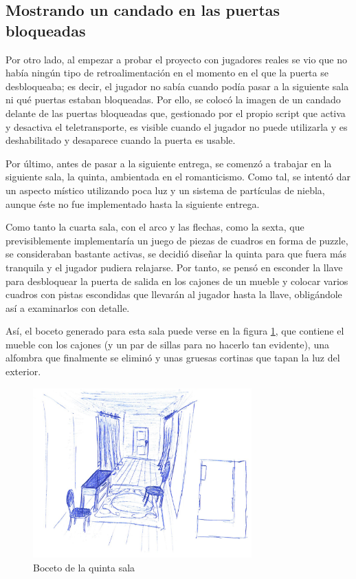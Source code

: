 \subsection{Mostrando un candado en las puertas bloqueadas}

Por otro lado, al empezar a probar el proyecto con jugadores reales se vio que no había ningún tipo de retroalimentación en el momento en el que la puerta se desbloqueaba; es decir, el jugador no sabía cuando podía pasar a la siguiente sala ni qué puertas estaban bloqueadas. Por ello, se colocó la imagen de un candado delante de las puertas bloqueadas que, gestionado por el propio script que activa y desactiva el teletransporte, es visible cuando el jugador no puede utilizarla y es deshabilitado y desaparece cuando la puerta es usable.

Por último, antes de pasar a la siguiente entrega, se comenzó a trabajar en la siguiente sala, la quinta, ambientada en el romanticismo. Como tal, se intentó dar un aspecto místico utilizando poca luz y un sistema de partículas de niebla, aunque éste no fue implementado hasta la siguiente entrega.

Como tanto la cuarta sala, con el arco y las flechas, como la sexta, que previsiblemente implementaría un juego de piezas de cuadros en forma de puzzle, se consideraban bastante activas, se decidió diseñar la quinta para que fuera más tranquila y el jugador pudiera relajarse. Por tanto, se pensó en esconder la llave para desbloquear la puerta de salida en los cajones de un mueble y colocar varios cuadros con pistas escondidas que llevarán al jugador hasta la llave, obligándole así a examinarlos con detalle.

Así, el boceto generado para esta sala puede verse en la figura \ref{fig:boceto-sala-5}, que contiene el mueble con los cajones (y un par de sillas para no hacerlo tan evidente), una alfombra que finalmente se eliminó y unas gruesas cortinas que tapan la luz del exterior.

\begin{figure}[!h]
\begin{center}
\includegraphics[width=0.75\textwidth]{imagenes/7/bocetos/boceto-sala-5.png}
\caption{Boceto de la quinta sala}
\label{fig:boceto-sala-5}
\end{center}
\end{figure}

